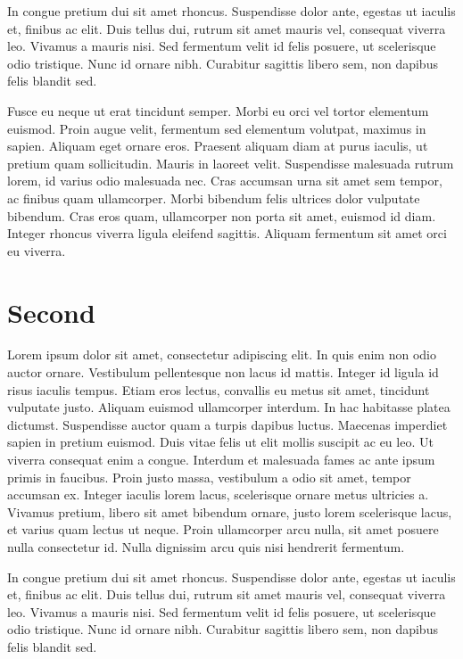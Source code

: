 \documentclass{scrartcl}
\begin{document}
In congue pretium dui sit amet rhoncus. Suspendisse dolor ante, egestas ut iaculis et, finibus ac elit. Duis tellus dui, rutrum sit amet mauris vel, consequat viverra leo. Vivamus a mauris nisi. Sed fermentum velit id felis posuere, ut scelerisque odio tristique. Nunc id ornare nibh. Curabitur sagittis libero sem, non dapibus felis blandit sed.

Fusce eu neque ut erat tincidunt semper. Morbi eu orci vel tortor elementum euismod. Proin augue velit, fermentum sed elementum volutpat, maximus in sapien. Aliquam eget ornare eros. Praesent aliquam diam at purus iaculis, ut pretium quam sollicitudin. Mauris in laoreet velit. Suspendisse malesuada rutrum lorem, id varius odio malesuada nec. Cras accumsan urna sit amet sem tempor, ac finibus quam ullamcorper. Morbi bibendum felis ultrices dolor vulputate bibendum. Cras eros quam, ullamcorper non porta sit amet, euismod id diam. Integer rhoncus viverra ligula eleifend sagittis. Aliquam fermentum sit amet orci eu viverra.
\section{Second}

Lorem ipsum dolor sit amet, consectetur adipiscing elit. In quis enim non odio auctor ornare. Vestibulum pellentesque non lacus id mattis. Integer id ligula id risus iaculis tempus. Etiam eros lectus, convallis eu metus sit amet, tincidunt vulputate justo. Aliquam euismod ullamcorper interdum. In hac habitasse platea dictumst. Suspendisse auctor quam a turpis dapibus luctus. Maecenas imperdiet sapien in pretium euismod. Duis vitae felis ut elit mollis suscipit ac eu leo. Ut viverra consequat enim a congue. Interdum et malesuada fames ac ante ipsum primis in faucibus. Proin justo massa, vestibulum a odio sit amet, tempor accumsan ex. Integer iaculis lorem lacus, scelerisque ornare metus ultricies a. Vivamus pretium, libero sit amet bibendum ornare, justo lorem scelerisque lacus, et varius quam lectus ut neque. Proin ullamcorper arcu nulla, sit amet posuere nulla consectetur id. Nulla dignissim arcu quis nisi hendrerit fermentum.

In congue pretium dui sit amet rhoncus. Suspendisse dolor ante, egestas ut iaculis et, finibus ac elit. Duis tellus dui, rutrum sit amet mauris vel, consequat viverra leo. Vivamus a mauris nisi. Sed fermentum velit id felis posuere, ut scelerisque odio tristique. Nunc id ornare nibh. Curabitur sagittis libero sem, non dapibus felis blandit sed.
\end{document}
